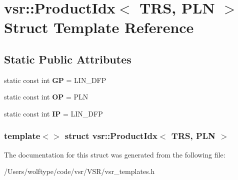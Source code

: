\hypertarget{structvsr_1_1_product_idx_3_01_t_r_s_00_01_p_l_n_01_4}{\section{vsr\-:\-:Product\-Idx$<$ T\-R\-S, P\-L\-N $>$ Struct Template Reference}
\label{structvsr_1_1_product_idx_3_01_t_r_s_00_01_p_l_n_01_4}
}
\subsection*{Static Public Attributes}
\begin{DoxyCompactItemize}
\item 
\hypertarget{structvsr_1_1_product_idx_3_01_t_r_s_00_01_p_l_n_01_4_a68cf612ab132d891c36e4dbd19bb65b1}{static const int {\bfseries G\-P} = L\-I\-N\-\_\-\-D\-F\-P}\label{structvsr_1_1_product_idx_3_01_t_r_s_00_01_p_l_n_01_4_a68cf612ab132d891c36e4dbd19bb65b1}

\item 
\hypertarget{structvsr_1_1_product_idx_3_01_t_r_s_00_01_p_l_n_01_4_ab730570e5d32d193d3f7790e17b6937a}{static const int {\bfseries O\-P} = P\-L\-N}\label{structvsr_1_1_product_idx_3_01_t_r_s_00_01_p_l_n_01_4_ab730570e5d32d193d3f7790e17b6937a}

\item 
\hypertarget{structvsr_1_1_product_idx_3_01_t_r_s_00_01_p_l_n_01_4_abfc1f9e6de6d59b785dd7f1a8cd4241f}{static const int {\bfseries I\-P} = L\-I\-N\-\_\-\-D\-F\-P}\label{structvsr_1_1_product_idx_3_01_t_r_s_00_01_p_l_n_01_4_abfc1f9e6de6d59b785dd7f1a8cd4241f}

\end{DoxyCompactItemize}
\subsubsection*{template$<$$>$ struct vsr\-::\-Product\-Idx$<$ T\-R\-S, P\-L\-N $>$}



The documentation for this struct was generated from the following file\-:\begin{DoxyCompactItemize}
\item 
/\-Users/wolftype/code/vsr/\-V\-S\-R/vsr\-\_\-templates.\-h\end{DoxyCompactItemize}

